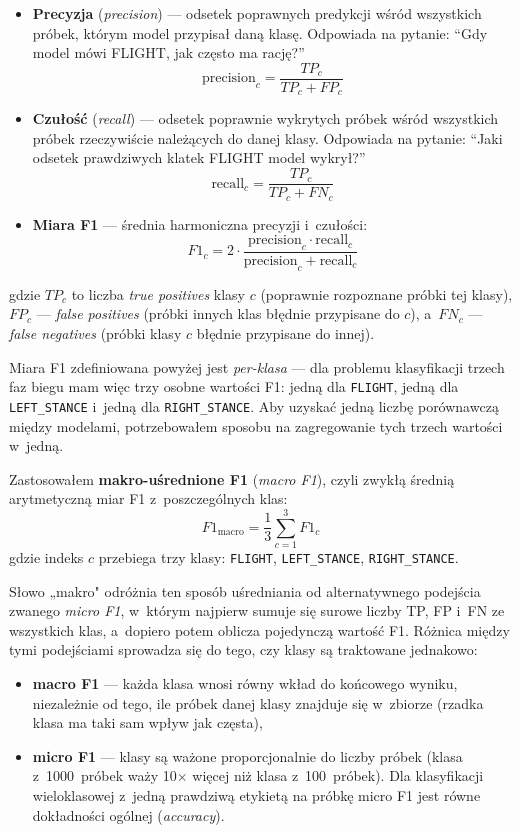\begin{itemize}
    \item \textbf{Precyzja} (\textit{precision}) --- odsetek poprawnych predykcji wśród wszystkich próbek, którym model przypisał daną klasę. Odpowiada na pytanie: ``Gdy model mówi FLIGHT, jak często ma rację?''
    \[
    \text{precision}_c = \frac{TP_c}{TP_c + FP_c}
    \]
    \item \textbf{Czułość} (\textit{recall}) --- odsetek poprawnie wykrytych próbek wśród wszystkich próbek rzeczywiście należących do danej klasy. Odpowiada na pytanie: ``Jaki odsetek prawdziwych klatek FLIGHT model wykrył?''
    \[
    \text{recall}_c = \frac{TP_c}{TP_c + FN_c}
    \]
    \item \textbf{Miara F1} --- średnia harmoniczna precyzji i~czułości:
    \[
    F1_c = 2 \cdot \frac{\text{precision}_c \cdot \text{recall}_c}{\text{precision}_c + \text{recall}_c}
    \]
\end{itemize}

\noindent
gdzie $TP_c$ to liczba \textit{true positives} klasy $c$ (poprawnie rozpoznane próbki tej klasy), $FP_c$ --- \textit{false positives} (próbki innych klas błędnie przypisane do $c$), a~$FN_c$ --- \textit{false negatives} (próbki klasy $c$ błędnie przypisane do innej).

Miara F1 zdefiniowana powyżej jest \textit{per-klasa} --- dla problemu klasyfikacji trzech faz biegu mam więc trzy osobne wartości F1: jedną dla \texttt{FLIGHT}, jedną dla \texttt{LEFT\_STANCE} i~jedną dla \texttt{RIGHT\_STANCE}. Aby uzyskać jedną liczbę porównawczą między modelami, potrzebowałem sposobu na zagregowanie tych trzech wartości w~jedną.

Zastosowałem \textbf{makro-uśrednione F1} (\textit{macro F1}), czyli zwykłą średnią arytmetyczną miar F1 z~poszczególnych klas:
\[
F1_{\text{macro}} = \frac{1}{3} \sum_{c=1}^{3} F1_c
\]
gdzie indeks $c$ przebiega trzy klasy: \texttt{FLIGHT}, \texttt{LEFT\_STANCE}, \texttt{RIGHT\_STANCE}.

Słowo „makro" odróżnia ten sposób uśredniania od alternatywnego podejścia zwanego \textit{micro F1}, w~którym najpierw sumuje się surowe liczby TP, FP i~FN ze wszystkich klas, a~dopiero potem oblicza pojedynczą wartość F1. Różnica między tymi podejściami sprowadza się do tego, czy klasy są traktowane jednakowo:

\begin{itemize}
    \item \textbf{macro F1} --- każda klasa wnosi równy wkład do końcowego wyniku, niezależnie od tego, ile próbek danej klasy znajduje się w~zbiorze (rzadka klasa ma taki sam wpływ jak częsta),
    \item \textbf{micro F1} --- klasy są ważone proporcjonalnie do liczby próbek (klasa z~1000~próbek waży 10$\times$ więcej niż klasa z~100~próbek). Dla klasyfikacji wieloklasowej z~jedną prawdziwą etykietą na próbkę micro F1 jest równe dokładności ogólnej (\textit{accuracy}).
\end{itemize}

